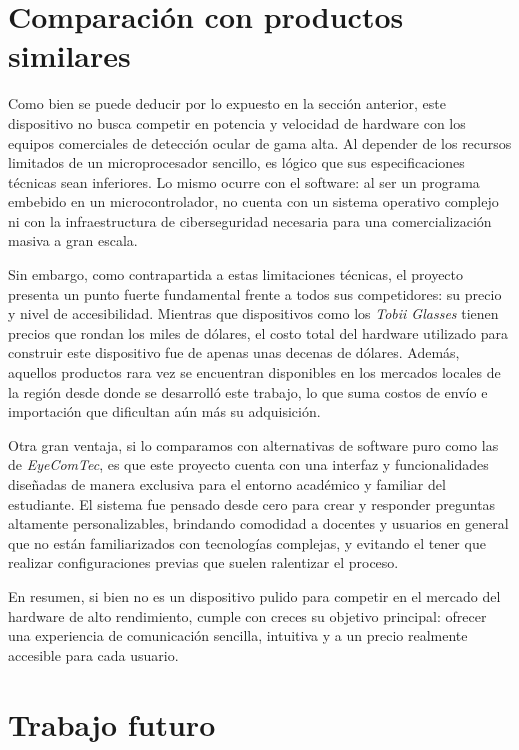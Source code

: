 \section{Comparación con productos similares}

Como bien se puede deducir por lo expuesto en la sección anterior, este dispositivo no busca competir en potencia y velocidad de hardware con los equipos comerciales de detección ocular de gama alta. Al depender de los recursos limitados de un microprocesador sencillo, es lógico que sus especificaciones técnicas sean inferiores. Lo mismo ocurre con el software: al ser un programa embebido en un microcontrolador, no cuenta con un sistema operativo complejo ni con la infraestructura de ciberseguridad necesaria para una comercialización masiva a gran escala.

Sin embargo, como contrapartida a estas limitaciones técnicas, el proyecto presenta un punto fuerte fundamental frente a todos sus competidores: su precio y nivel de accesibilidad. Mientras que dispositivos como los \emph{Tobii Glasses} tienen precios que rondan los miles de dólares, el costo total del hardware utilizado para construir este dispositivo fue de apenas unas decenas de dólares. Además, aquellos productos rara vez se encuentran disponibles en los mercados locales de la región desde donde se desarrolló este trabajo, lo que suma costos de envío e importación que dificultan aún más su adquisición.

Otra gran ventaja, si lo comparamos con alternativas de software puro como las de \emph{EyeComTec}, es que este proyecto cuenta con una interfaz y funcionalidades diseñadas de manera exclusiva para el entorno académico y familiar del estudiante. El sistema fue pensado desde cero para crear y responder preguntas altamente personalizables, brindando comodidad a docentes y usuarios en general que no están familiarizados con tecnologías complejas, y evitando el tener que realizar configuraciones previas que suelen ralentizar el proceso.

En resumen, si bien no es un dispositivo pulido para competir en el mercado del hardware de alto rendimiento, cumple con creces su objetivo principal: ofrecer una experiencia de comunicación sencilla, intuitiva y a un precio realmente accesible para cada usuario.


\section{Trabajo futuro}